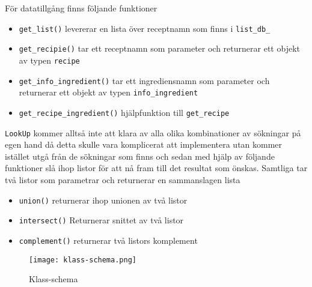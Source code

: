 För datatillgång finns följande funktioner

\begin{itemize}
\item   \verb+get_list()+ levererar en lista över receptnamn som finns i \verb+list_db_+

\item   \verb+get_recipie()+ tar ett receptnamn som parameter och returnerar ett 
        objekt av typen \verb+recipe+

\item   \verb+get_info_ingredient()+ tar ett ingrediensnamn som parameter och returnerar 
        ett objekt av typen \verb+info_ingredient+

\item   \verb+get_recipe_ingredient()+ hjälpfunktion till \verb+get_recipe+
\end{itemize}

\verb+LookUp+ kommer alltså inte att klara av alla olika kombinationer av
sökningar på egen hand då detta skulle vara komplicerat att implementera utan
kommer istället utgå från de sökningar som finns och sedan med hjälp
av följande funktioner slå ihop listor för att nå fram till det
resultat som önskas. Samtliga tar två listor som parametrar och
returnerar en sammanslagen lista

\begin{itemize}
\item   \verb+union()+ returnerar ihop unionen av två listor
\item   \verb+intersect()+ Returnerar snittet av två listor
\item   \verb+complement()+ returnerar två listors komplement
\end{itemize}

\begin{figure}[h]
\centering
\texttt{[image: klass-schema.png]}
\label{fig:classes}
\caption{Klass-schema}
\end{figure}

